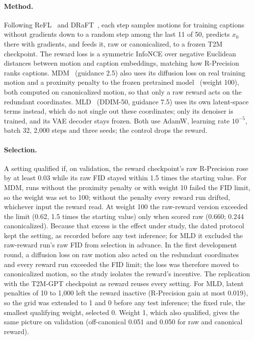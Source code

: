 \documentclass[10pt,twocolumn,letterpaper]{article}
\begin{document}
\paragraph{Method.} Following ReFL~\cite{xu2023imagereward} and DRaFT~\cite{draft2024}, each step samples motions for training captions without gradients down to a random step among the last 11 of 50, predicts $x_0$ there with gradients, and feeds it, raw or canonicalized, to a frozen T2M checkpoint. The reward loss is a symmetric InfoNCE over negative Euclidean distances between motion and caption embeddings, matching how R-Precision ranks captions. MDM~\cite{tevet2023} (guidance 2.5) also uses its diffusion loss on real training motion and a proximity penalty to the frozen pretrained model~\cite{fan2023dpok} (weight 100), both computed on canonicalized motion, so that only a raw reward acts on the redundant coordinates. MLD~\cite{mld2023} (DDIM-50, guidance 7.5) uses its own latent-space terms instead, which do not single out these coordinates; only its denoiser is trained, and its VAE decoder stays frozen. Both use AdamW, learning rate $10^{-5}$, batch 32, 2,000 steps and three seeds; the control drops the reward.

\paragraph{Selection.} A setting qualified if, on validation, the reward checkpoint's raw R-Precision rose by at least 0.03 while its raw FID stayed within 1.5 times the starting value. For MDM, runs without the proximity penalty or with weight 10 failed the FID limit, so the weight was set to 100; without the penalty every reward run drifted, whichever input the reward read. At weight 100 the raw-reward version exceeded the limit (0.62, 1.5 times the starting value) only when scored raw (0.660; 0.244 canonicalized). Because that excess is the effect under study, the dated protocol kept the setting, as recorded before any test inference; for MLD it excluded the raw-reward run's raw FID from selection in advance. In the first development round, a diffusion loss on raw motion also acted on the redundant coordinates and every reward run exceeded the FID limit; the loss was therefore moved to canonicalized motion, so the study isolates the reward's incentive. The replication with the T2M-GPT checkpoint as reward reuses every setting. For MLD, latent penalties of 10 to 1,000 left the reward inactive (R-Precision gain at most 0.019), so the grid was extended to 1 and 0 before any test inference; the fixed rule, the smallest qualifying weight, selected 0. Weight 1, which also qualified, gives the same picture on validation (off-canonical 0.051 and 0.050 for raw and canonical reward).
\end{document}
